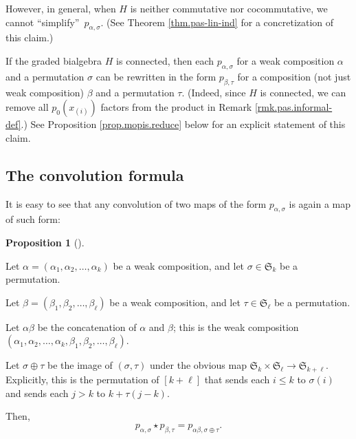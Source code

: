 \documentclass[numbers=enddot,12pt,final,onecolumn,notitlepage]{scrartcl}%
\theoremstyle{definition}
\newtheorem{prop}[theo]{Proposition}
\newenvironment{proposition}[1][]
{\begin{prop}[#1]\begin{leftbar}}
{\end{leftbar}\end{prop}}
\begin{document}
However, in general, when $H$ is neither commutative nor cocommutative, we
cannot \textquotedblleft simplify\textquotedblright\ $p_{\alpha,\sigma}$. (See
Theorem \ref{thm.pas-lin-ind} for a concretization of this claim.)

If the graded bialgebra $H$ is connected, then each $p_{\alpha,\sigma}$ for a
weak composition $\alpha$ and a permutation $\sigma$ can be rewritten in the
form $p_{\beta,\tau}$ for a composition (not just weak composition) $\beta$
and a permutation $\tau$. (Indeed, since $H$ is connected, we can remove all
$p_{0}\left(  x_{\left(  i\right)  }\right)  $ factors from the product in
Remark \ref{rmk.pas.informal-def}.) See Proposition \ref{prop.mopis.reduce}
below for an explicit statement of this claim.

\subsection{The convolution formula}

It is easy to see that any convolution of two maps of the form $p_{\alpha
,\sigma}$ is again a map of such form:

\begin{proposition}
\label{prop.sol-mac-0}Let $\alpha=\left(  \alpha_{1},\alpha_{2},\ldots
,\alpha_{k}\right)  $ be a weak composition, and let $\sigma\in\mathfrak{S}%
_{k}$ be a permutation.

Let $\beta=\left(  \beta_{1},\beta_{2},\ldots,\beta_{\ell}\right)  $ be a weak
composition, and let $\tau\in\mathfrak{S}_{\ell}$ be a permutation.

Let $\alpha\beta$ be the concatenation of $\alpha$ and $\beta$; this is the
weak composition $\left(  \alpha_{1},\alpha_{2},\ldots,\alpha_{k},\beta
_{1},\beta_{2},\ldots,\beta_{\ell}\right)  $.

Let $\sigma\oplus\tau$ be the image of $\left(  \sigma,\tau\right)  $ under
the obvious map $\mathfrak{S}_{k}\times\mathfrak{S}_{\ell}\rightarrow
\mathfrak{S}_{k+\ell}$. Explicitly, this is the permutation of $\left[
k+\ell\right]  $ that sends each $i\leq k$ to $\sigma\left(  i\right)  $ and
sends each $j>k$ to $k+\tau\left(  j-k\right)  $.

Then,
\begin{equation}
p_{\alpha,\sigma}\star p_{\beta,\tau}=p_{\alpha\beta,\sigma\oplus\tau}.
\label{eq.pas-conv}%
\end{equation}

\end{proposition}
\end{document}
